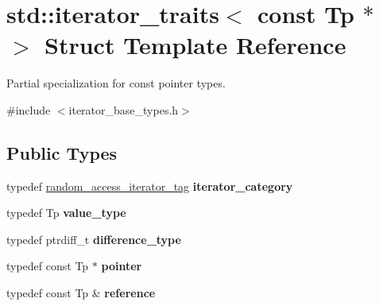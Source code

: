 \hypertarget{structstd_1_1iterator__traits_3_01const_01Tp_01_5_01_4}{}\section{std\+:\+:iterator\+\_\+traits$<$ const Tp $\ast$ $>$ Struct Template Reference}
\label{structstd_1_1iterator__traits_3_01const_01Tp_01_5_01_4}


Partial specialization for const pointer types.  




{\ttfamily \#include $<$iterator\+\_\+base\+\_\+types.\+h$>$}

\subsection*{Public Types}
\begin{DoxyCompactItemize}
\item 
typedef \hyperlink{structstd_1_1random__access__iterator__tag}{random\+\_\+access\+\_\+iterator\+\_\+tag} {\bfseries iterator\+\_\+category}\hypertarget{structstd_1_1iterator__traits_3_01const_01Tp_01_5_01_4_ae56745812f294d84191fe0a26e105d68}{}\label{structstd_1_1iterator__traits_3_01const_01Tp_01_5_01_4_ae56745812f294d84191fe0a26e105d68}

\item 
typedef Tp {\bfseries value\+\_\+type}\hypertarget{structstd_1_1iterator__traits_3_01const_01Tp_01_5_01_4_a06e3e33be46daf3f0f7f433941f288f8}{}\label{structstd_1_1iterator__traits_3_01const_01Tp_01_5_01_4_a06e3e33be46daf3f0f7f433941f288f8}

\item 
typedef ptrdiff\+\_\+t {\bfseries difference\+\_\+type}\hypertarget{structstd_1_1iterator__traits_3_01const_01Tp_01_5_01_4_a76dfaf7b65228b3d7f52c3a02058123b}{}\label{structstd_1_1iterator__traits_3_01const_01Tp_01_5_01_4_a76dfaf7b65228b3d7f52c3a02058123b}

\item 
typedef const Tp $\ast$ {\bfseries pointer}\hypertarget{structstd_1_1iterator__traits_3_01const_01Tp_01_5_01_4_a759981871206466c565c8361c65b37bb}{}\label{structstd_1_1iterator__traits_3_01const_01Tp_01_5_01_4_a759981871206466c565c8361c65b37bb}

\item 
typedef const Tp \& {\bfseries reference}\hypertarget{structstd_1_1iterator__traits_3_01const_01Tp_01_5_01_4_a19e443baa06cd1c5612989189de4b950}{}\label{structstd_1_1iterator__traits_3_01const_01Tp_01_5_01_4_a19e443baa06cd1c5612989189de4b950}

\end{DoxyCompactItemize}


